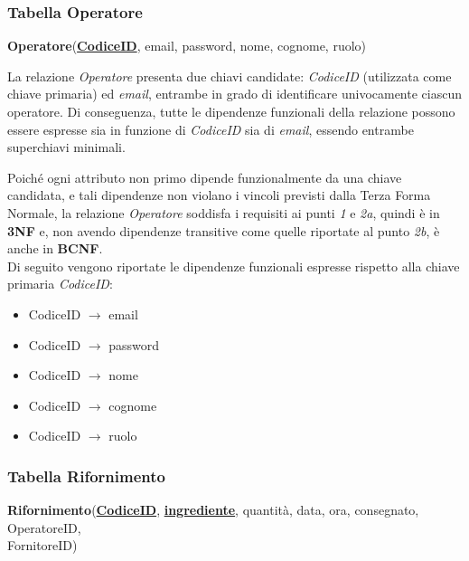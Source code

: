 \documentclass[12pt,a4paper]{article}
\begin{document}
    \subsubsection*{Tabella Operatore}
    \begin{tcolorbox}[
        colback=gray!8,
        colframe=black!30,
        title=
    ]
        \textbf{Operatore}(\textbf{\uline{CodiceID}}, email, password, nome, cognome, ruolo)
    \end{tcolorbox}

    \noindent
    La relazione \textit{Operatore} presenta due chiavi candidate: \textit{CodiceID} (utilizzata come chiave primaria) ed \textit{email}, entrambe in grado di identificare univocamente ciascun operatore. Di conseguenza, tutte le dipendenze funzionali della relazione possono essere espresse sia in funzione di \textit{CodiceID} sia di \textit{email}, essendo entrambe superchiavi minimali.

    \vspace{8pt}
    \noindent
    Poiché ogni attributo non primo dipende funzionalmente da una chiave candidata, e tali dipendenze non violano i vincoli previsti dalla Terza Forma Normale, la relazione \textit{Operatore} soddisfa i requisiti ai punti \textit{1} e \textit{2a}, quindi è in \textbf{3NF} e, non avendo dipendenze transitive come quelle riportate al punto \textit{2b}, è anche in \textbf{BCNF}.\\
    Di seguito vengono riportate le dipendenze funzionali espresse rispetto alla chiave primaria \textit{CodiceID}:
    \begin{itemize}[leftmargin=1em, label=$\circ$]
        \item CodiceID $\rightarrow$ email
        \item CodiceID $\rightarrow$ password
        \item CodiceID $\rightarrow$ nome
        \item CodiceID $\rightarrow$ cognome
        \item CodiceID $\rightarrow$ ruolo
    \end{itemize}
    


    \subsubsection*{Tabella Rifornimento}
    \begin{tcolorbox}[
        colback=gray!8,
        colframe=black!30,
        title=
    ]
        \textbf{Rifornimento}(\textbf{\uline{CodiceID}}, \textbf{\uline{ingrediente}}, quantità, data, ora, consegnato, OperatoreID, \\FornitoreID)
    \end{tcolorbox}
    
\end{document}
